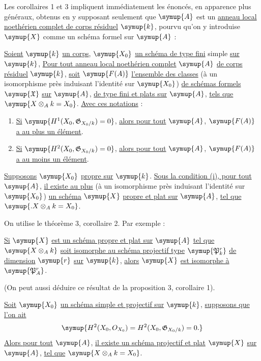Les corollaires 1 et 3 impliquent immédiatement les énoncés, en apparence plus
généraux, obtenus en y supposant seulement que $\symup{A}$ est un \uline{anneau local noethérien complet de corps résiduel} $\symup{k}$, pourvu qu'on y introduise $\symup{X}$ comme
un schéma formel sur $\symup{A}$ :

 \uline{Soient} $\symup{k}$ \uline{un corps}, $\symup{X_0}$ \uline{un schéma de type fini} simple
\uline{sur} $\symup{k}$, \uline{Pour tout anneau local noethérien complet} $\symup{A}$ \uline{de corps résiduel} $\symup{k}$,
\uline{soit} $\symup{F(A)}$ \uline{l'ensemble des classes} (à un isomorphisme près induisant l'identité
sur $\symup{X_0}$)
\uline{de schémas formels} $\symup{\mathfrak X}$ \uline{sur} $\symup{A}$, \uline{de type fini et plats sur}
$\symup{A}$, \uline{tels que} $\symup{X\otimes_A k=X_0}$. \uline{Avec ces notations} :
\begin{enumerate}
  \item[\textnormal{i.}] \uline{Si} $\symup{H^1(X_0,\mathfrak G_{X_0/k})=0}$, \uline{alors pour tout} $\symup{A}$,
    $\symup{F(A)}$ \uline{a au plus un élément}.
  \item[\textnormal{ii.}] \uline{Si} $\symup{H^2(X_0,\mathfrak G_{X_0/k})=0}$, \uline{alors pour tout} $\symup{A}$,
    $\symup{F(A)}$ \uline{a au moins un élément}.
\end{enumerate}

 \uline{Supposons} $\symup{X_0}$ \uline{propre sur} $\symup{k}$. \uline{Sous la condition
(i), pour tout} $\symup{A}$, \uline{il existe au plus} (à un isomorphisme près
induisant l'identité sur $\symup{X_0}$) \uline{un schéma} $\symup{X}$ \uline{propre et plat sur} $\symup{A}$, \uline{tel que}
$\symup{.X\otimes_A k=X_0}$.

On utilise le théorème 3, corollaire 2. Par exemple :

 \uline{Si} $\symup{X}$ \uline{est un schéma propre et plat sur} $\symup{A}$ \uline{tel que}
$\symup{X\otimes_A k}$ \uline{soit isomorphe au schéma projectif type} $\symup{\mathfrak P_k^r}$ \uline{de
dimension} $\symup{r}$ \uline{sur} $\symup{k}$, \uline{alors} $\symup{X}$ \uline{est isomorphe à} $\symup{\mathfrak P_A^r}$.

(On peut aussi déduire ce résultat de la proposition 3, corollaire 1).

 \uline{Soit} $\symup{X_0}$ \uline{un schéma simple et projectif sur} $\symup{k}$,
\uline{supposons que l'on ait}
\[
  \symup{H^2(X_0,O_{X_0})=H^2(X_0,\mathfrak G_{X_0/k})=0.}
\]
\uline{Alors pour tout} $\symup{A}$, \uline{il existe un schéma projectif et plat} $\symup{X}$ \uline{sur} $\symup{A}$, \uline{tel que}
$\symup{X\otimes_A k=X_0}$.

